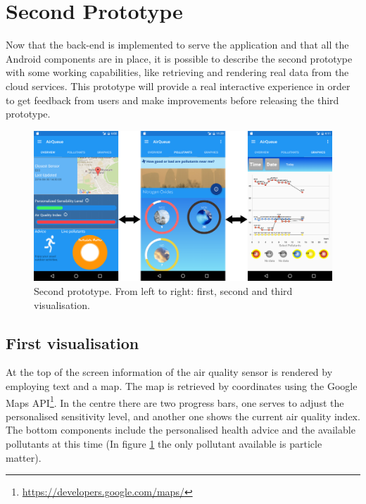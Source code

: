 \section{Second Prototype}
Now that the back-end is implemented to serve the application and that all the Android components are in place, it is possible to describe the second prototype with some working capabilities, like retrieving and rendering real data from the cloud services. This prototype will provide a real interactive experience in order to get feedback from users and make improvements before releasing the third prototype. 

\begin{figure}[H]
\begin{adjustbox}{width=1.2\textwidth,center=\textwidth}
  \centering
  \includegraphics[scale=1]{images/secondPrototype.png}
\end{adjustbox}
  \caption[Second prototype]{Second prototype. From left to right: first, second and third visualisation.}
  \label{fig:first_second_prototype}
\end{figure}

\subsection{First visualisation}
At the top of the screen information of the air quality sensor is rendered by employing text and a map. The map is retrieved by coordinates using the Google Maps API\footnote{\url{https://developers.google.com/maps/}}. In the centre there are two progress bars, one serves to adjust the personalised sensitivity level, and another one shows the current air quality index. The bottom components include the personalised health advice and the available pollutants at this time (In figure \ref{fig:first_second_prototype} the only pollutant available is particle matter). 

